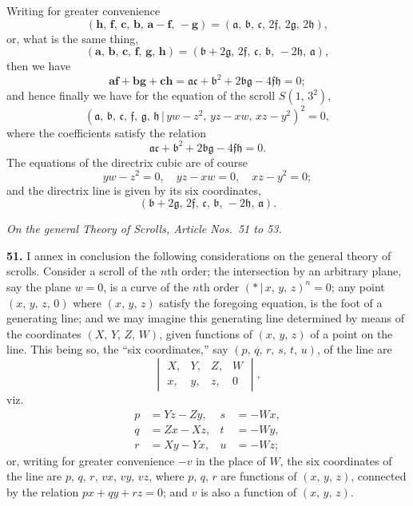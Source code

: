 \documentclass[11pt,a4paper]{article}
\providecommand{\mid}{\,|\,}
\begin{document}
Writing for greater convenience
\[
(\mathbf{h},\,\mathbf{f},\,\mathbf{c},\,\mathbf{b},\,\mathbf{a} - \mathbf{f},\,-\mathbf{g}) = (\mathfrak{a},\,\mathfrak{b},\,\mathfrak{c},\,2\mathfrak{f},\,2\mathfrak{g},\,2\mathfrak{h}),
\]
or, what is the same thing,
\[
(\mathbf{a},\,\mathbf{b},\,\mathbf{c},\,\mathbf{f},\,\mathbf{g},\,\mathbf{h}) = (\mathfrak{b} + 2\mathfrak{g},\,2\mathfrak{f},\,\mathfrak{c},\,\mathfrak{b},\,-2\mathfrak{h},\,\mathfrak{a}),
\]
then we have
\[
\mathbf{af + bg + ch} = \mathfrak{ac} + \mathfrak{b}^{2} + 2\mathfrak{bg} - 4\mathfrak{fh} = 0;
\]
and hence finally we have for the equation of the scroll $S(1,\,3^{2})$,
\[
(\mathfrak{a},\,\mathfrak{b},\,\mathfrak{c},\,\mathfrak{f},\,\mathfrak{g},\,\mathfrak{h}\mid yw - z^{2},\,yz - xw,\,xz - y^{2})^{2} = 0,
\]
where the coefficients satisfy the relation
\[
\mathfrak{ac} + \mathfrak{b}^{2} + 2\mathfrak{bg} - 4\mathfrak{fh} = 0.
\]
The equations of the directrix cubic are of course
\[
yw - z^{2} = 0,\quad yz - xw = 0,\quad xz - y^{2} = 0;
\]
and the directrix line is given by its six coordinates,
\[
(\mathfrak{b} + 2\mathfrak{g},\,2\mathfrak{f},\,\mathfrak{c},\,\mathfrak{b},\,-2\mathfrak{h},\,\mathfrak{a}).
\]

\bigskip

\begin{center}
\textit{On the general Theory of Scrolls, Article Nos.\ 51 to 53.}
\end{center}

\textbf{51.} I annex in conclusion the following considerations on the general theory of scrolls. Consider a scroll of the $n$th order; the intersection by an arbitrary plane, say the plane $w = 0$, is a curve of the $n$th order $(*\mid x,\,y,\,z)^{n} = 0$; any point $(x,\,y,\,z,\,0)$ where $(x,\,y,\,z)$ satisfy the foregoing equation, is the foot of a generating line; and we may imagine this generating line determined by means of the coordinates $(X,\,Y,\,Z,\,W)$, given functions of $(x,\,y,\,z)$ of a point on the line. This being so, the ``six coordinates,'' say $(p,\,q,\,r,\,s,\,t,\,u)$, of the line are
\[
\begin{vmatrix} X, & Y, & Z, & W \\ x, & y, & z, & 0 \end{vmatrix},
\]
viz.
\[
\begin{aligned}
p &= Yz - Zy, & s &= -Wx,\\
q &= Zx - Xz, & t &= -Wy,\\
r &= Xy - Yx, & u &= -Wz;
\end{aligned}
\]
or, writing for greater convenience $-v$ in the place of $W$, the six coordinates of the line are $p,\,q,\,r,\,vx,\,vy,\,vz$, where $p,\,q,\,r$ are functions of $(x,\,y,\,z)$, connected by the relation $px + qy + rz = 0$; and $v$ is also a function of $(x,\,y,\,z)$.
\end{document}

